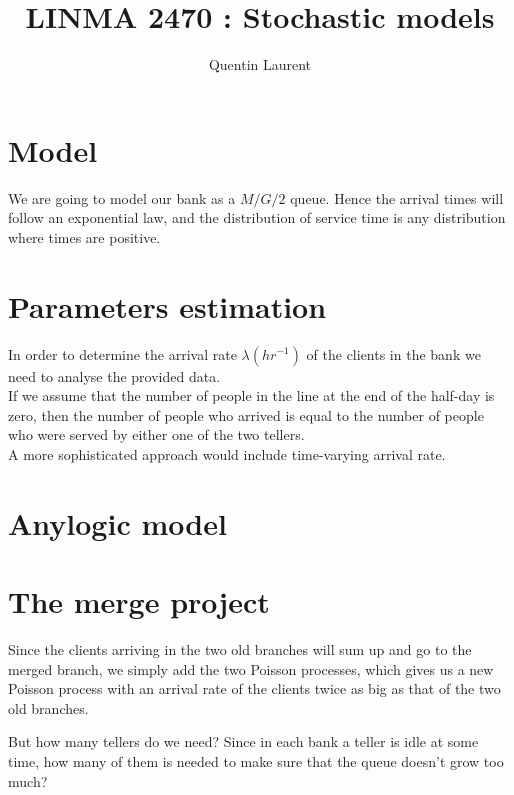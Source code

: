 \documentclass[12pt,a4paper,notitlepage]{report}
\title{LINMA 2470 : Stochastic models}
\author{Quentin Laurent}
\begin{document}
\maketitle
\section*{Model}
We are going to model our bank as a $M/G/2$ queue. Hence the arrival times will follow an exponential law, and the distribution of service time is any distribution where times are positive.
\section*{Parameters estimation}
In order to determine the arrival rate $\lambda (hr^{-1})$ of the clients in the bank we need to analyse the provided data.\\
If we assume that the number of people in the line at the end of the half-day is zero, then the number of people who arrived is equal to the number of people who were served by either one of the two tellers.\\
A more sophisticated approach would include time-varying arrival rate.


\section*{Anylogic model}


\section*{The merge project}
 Since the clients arriving in the two old branches will sum up and go to the merged branch, we simply add the two Poisson processes, which gives us a new Poisson process with an arrival rate of the clients twice as big as that of the two old branches.

But how many tellers do we need? Since in each bank a teller is idle at some time, how many of them is needed to make sure that the queue doesn't grow too much?
\end{document}
